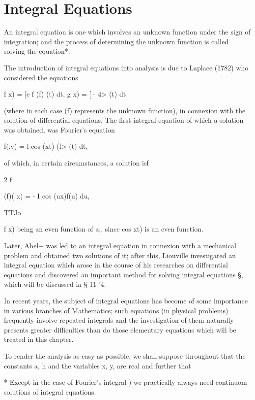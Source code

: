 %
%
\chapter{Integral Equations}


An integral equation is one which involves an unknown function under
the sign of integration; and the process of determining the unknown
function is called solving the equation*.

The introduction of integral equations into analysis is due to Laplace
(1782) who considered the equations

f x) = [e f (f) (t) dt, g x) = [ - 4> (t) dt

(where in each case (f) represents the unknown function), in connexion
with the solution of differential equations. The first integral
equation of which a solution was obtained, was Fourier's equation

f(.v) = l cos (xt) (f> (t) dt,

of which, in certain circumstances, a solution isf

2 f

(f)( x) = - I cos (ux)f(u) du,

TTJo

f x) being an even function of a;, since cos xt) is an even function.

Later, Abel+ was led to an integral equation in connexion with a
mechanical problem and obtained two solutions of it; after this,
Liouville investigated an integral equation which arose in the course
of his researches on differential equations and discovered an
important method for solving integral equations §, which will be
discussed in § 11 '4.

In recent years, the subject of integral equations has become of some
importance in various branches of Mathematics; such equations (in
physical problems) frequently involve repeated integrals and the
investigation of them naturally presents greater difficulties than do
those elementary equations which will be treated in this chapter.

To render the analysis as easy as possible, we shall suppose
throughout that the constants a, h and the variables x, y, are real
and further that

* Except in the case of Fourier's integral ) we practically
always need continuom solutions of integral equations.

